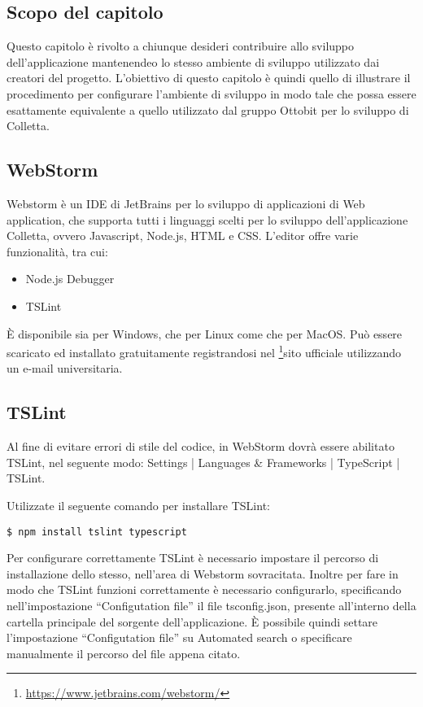 \subsection{Scopo del capitolo}
Questo capitolo è rivolto a chiunque desideri contribuire allo sviluppo dell'applicazione mantenendeo lo stesso ambiente di sviluppo utilizzato dai creatori del progetto.
L'obiettivo di questo capitolo è quindi quello di illustrare il procedimento per configurare l'ambiente di sviluppo in modo tale che possa essere esattamente equivalente a quello utilizzato dal gruppo Ottobit per lo sviluppo di Colletta.

\subsection{WebStorm}
Webstorm è un IDE di JetBrains per lo sviluppo di applicazioni di Web application, che supporta tutti i linguaggi scelti per lo sviluppo dell'applicazione Colletta, ovvero Javascript, Node.js, HTML e CSS.
L'editor offre varie funzionalità, tra cui:
\begin{itemize}
	\item Node.js Debugger
	\item TSLint
\end{itemize}
È disponibile sia per Windows, che per Linux come che per MacOS.
Può essere scaricato ed installato gratuitamente registrandosi nel \footnote{\url{https://www.jetbrains.com/webstorm/}}sito ufficiale utilizzando un e-mail universitaria.

\subsection{TSLint}
Al fine di evitare errori di stile del codice, in WebStorm dovrà essere abilitato TSLint, nel seguente modo: Settings | Languages \& Frameworks | TypeScript | TSLint.

Utilizzate il seguente comando per installare TSLint:
\begin{center}
		\begin{minipage}{0.5\textwidth}
			\begin{lstlisting}[caption=Installazione per l'analisi statica,numbers=none]			
		$ npm install tslint typescript
			\end{lstlisting}
		\end{minipage}
\end{center}
Per configurare correttamente TSLint è necessario impostare il percorso di installazione dello stesso, nell'area di Webstorm sovracitata.
Inoltre per fare in modo che TSLint funzioni correttamente è necessario configurarlo, specificando nell'impostazione ``Configutation file'' il file tsconfig.json, presente all'interno della cartella principale del sorgente dell'applicazione. È possibile quindi settare l'impostazione ``Configutation file'' su Automated search o specificare manualmente il percorso del file appena citato.


